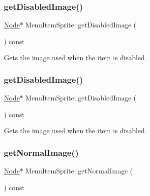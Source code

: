 \subsubsection{\texorpdfstring{get\+Disabled\+Image()}{getDisabledImage()}\hspace{0.1cm}{\footnotesize\ttfamily [1/2]}}
{\footnotesize\ttfamily \hyperlink{classNode}{Node}$\ast$ Menu\+Item\+Sprite\+::get\+Disabled\+Image (\begin{DoxyParamCaption}{ }\end{DoxyParamCaption}) const\hspace{0.3cm}{\ttfamily [inline]}}

Gets the image used when the item is disabled. \mbox{\label{classMenuItemSprite_a9db9e0e79bfc17d27f697a69b023b0c5}} 
\subsubsection{\texorpdfstring{get\+Disabled\+Image()}{getDisabledImage()}\hspace{0.1cm}{\footnotesize\ttfamily [2/2]}}
{\footnotesize\ttfamily \hyperlink{classNode}{Node}$\ast$ Menu\+Item\+Sprite\+::get\+Disabled\+Image (\begin{DoxyParamCaption}{ }\end{DoxyParamCaption}) const\hspace{0.3cm}{\ttfamily [inline]}}

Gets the image used when the item is disabled. \mbox{\label{classMenuItemSprite_a58e62e7a8c9255d7dddaf1e868637aa3}} 
\subsubsection{\texorpdfstring{get\+Normal\+Image()}{getNormalImage()}\hspace{0.1cm}{\footnotesize\ttfamily [1/2]}}
{\footnotesize\ttfamily \hyperlink{classNode}{Node}$\ast$ Menu\+Item\+Sprite\+::get\+Normal\+Image (\begin{DoxyParamCaption}{ }\end{DoxyParamCaption}) const\hspace{0.3cm}{\ttfamily [inline]}}

